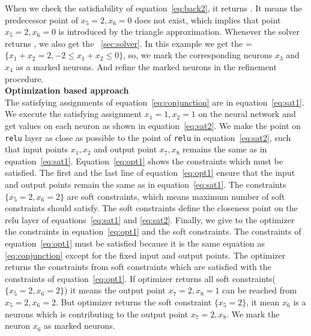 When we check the satisfiability of equation~\ref{eq:back2}, it returns \unsat{}. It means the predecessor point of 
$x_5=2,x_6=0$ does not exist, which implies that point $x_5=2, x_6=0$ is introduced by the triangle approximation.
Whenever the solver returns \unsat{}, we also get the \unsatcore{}~\ref{sec:solver}. In this example we get the 
\unsatcore{}=$\{x_1+x_2=2, -2\leq  x_1+x_2 \leq 0\}$, so, we mark the corresponding neurons $x_3$ and $x_4$ as a marked neurons. 
And refine the marked neurons in the refinement procedure. 
\\
\textbf{Optimization based approach}\\
The satisfying assignments of equation~\ref{eq:conjunction} are in equation~\ref{eq:sat1}. 
We execute the satisfying assignment $x_1=1,x_2=1$ on the neural network and get values on each neuron as 
shown in equation~\ref{eq:sat2}. We make the point on \texttt{relu} layer as close as possible 
to the point of \texttt{relu} in equation~\ref{eq:sat2}, such that input points $x_1,x_2$ and 
output point $x_7,x_8$ remains the same as in equation~\ref{eq:sat1}. 
Equation~\ref{eq:opt1} shows the constraints which must be satisfied. The first and the last line of equation~\ref{eq:opt1}
ensure that the input and output points remain the same as in equation~\ref{eq:sat1}. 
The constraints $\{x_5=2, x_6=2\}$ are soft constraints, which means maximum number of soft constraints should satisfy. 
The soft constraints define the closeness point on the relu layer of equations~\ref{eq:sat1} and \ref{eq:sat2}. 
Finally, we give to the optimizer the constraints in equation~\ref{eq:opt1} and the soft constraints. 
The constraints of equation~\ref{eq:opt1} must be satisfied because it is the same equation as \ref{eq:conjunction}
except for the fixed input and output points. 
The optimizer returns the constraints from soft constraints which are satisfied with the constraints 
of equation~\ref{eq:opt1}. If optimizer returns all soft constraints($\{x_5=2,x_6=2\}$) it means the output point
$x_7=2, x_8=1$ can be reached from $x_5=2,x_6=2$. But optimizer returns the soft constraint $\{x_5=2\}$, it mean 
$x_6$ is a neurons which is contributing to the output point $x_7=2, x_8$. We mark the neuron $x_6$ as 
marked neurons.  

